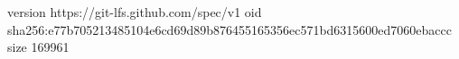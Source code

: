 version https://git-lfs.github.com/spec/v1
oid sha256:e77b705213485104e6cd69d89b876455165356ec571bd6315600ed7060ebaccc
size 169961
